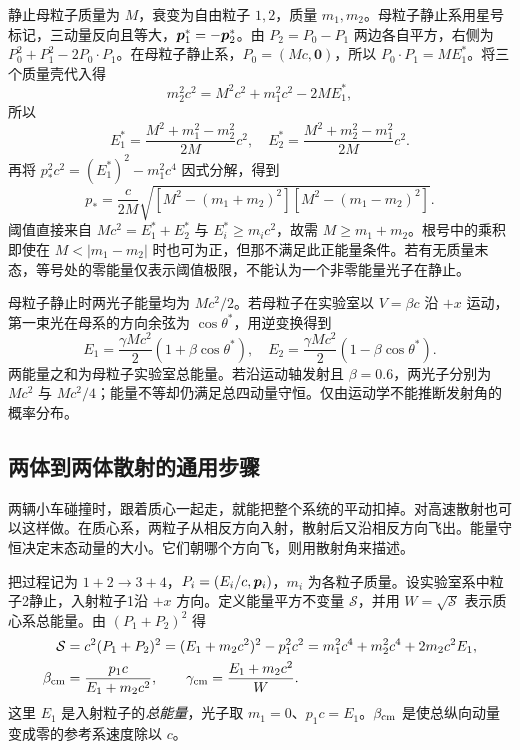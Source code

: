 静止母粒子质量为 $M$，衰变为自由粒子 $1,2$，质量 $m_1,m_2$。母粒子静止系用星号标记，三动量反向且等大，$\boldsymbol{p}_1^*=-\boldsymbol{p}_2^*$。由 $P_2=P_0-P_1$ 两边各自平方，右侧为 $P_0^2+P_1^2-2P_0\cdot P_1$。在母粒子静止系，$P_0=(Mc,\boldsymbol0)$，所以 $P_0\cdot P_1=ME_1^*$。将三个质量壳代入得
\[
m_2^2c^2=M^2c^2+m_1^2c^2-2ME_1^*,
\]
所以
\begin{equation}\label{eq:sr-decay}
E_1^*=\frac{M^2+m_1^2-m_2^2}{2M}c^2,\quad
E_2^*=\frac{M^2+m_2^2-m_1^2}{2M}c^2.
\end{equation}
再将 $p_*^2c^2=(E_1^*)^2-m_1^2c^4$ 因式分解，得到
\[
p_* =\frac{c}{2M}\sqrt{[M^2-(m_1+m_2)^2][M^2-(m_1-m_2)^2]}.
\]
阈值直接来自 $Mc^2=E_1^*+E_2^*$ 与 $E_i^*\ge m_i c^2$，故需 $M\ge m_1+m_2$。根号中的乘积即使在 $M<|m_1-m_2|$ 时也可为正，但那不满足此正能量条件。若有无质量末态，等号处的零能量仅表示阈值极限，不能认为一个非零能量光子在静止。

\begin{example}[运动母粒子衰变为两光子]
母粒子静止时两光子能量均为 $Mc^2/2$。若母粒子在实验室以 $V=\beta c$ 沿 $+x$ 运动，第一束光在母系的方向余弦为 $\cos\theta^*$，用逆变换得到
\[
E_1=\frac{\gamma Mc^2}{2}(1+\beta\cos\theta^*),\quad
E_2=\frac{\gamma Mc^2}{2}(1-\beta\cos\theta^*).
\]
两能量之和为母粒子实验室总能量。若沿运动轴发射且 $\beta=0.6$，两光子分别为 $Mc^2$ 与 $Mc^2/4$；能量不等却仍满足总四动量守恒。仅由运动学不能推断发射角的概率分布。
\end{example}

\subsection{两体到两体散射的通用步骤}\label{sec:sr-two-to-two}
两辆小车碰撞时，跟着质心一起走，就能把整个系统的平动扣掉。对高速散射也可以这样做。在质心系，两粒子从相反方向入射，散射后又沿相反方向飞出。能量守恒决定末态动量的大小。它们朝哪个方向飞，则用散射角来描述。

把过程记为 $1+2\to3+4$，$P_i=(E_i/c,\boldsymbol{p}_i)$，$m_i$ 为各粒子质量。设实验室系中粒子2静止，入射粒子1沿 $+x$ 方向。定义能量平方不变量 $\mathcal S$，并用 $W=\sqrt{\mathcal S}$ 表示质心系总能量。由 $(P_1+P_2)^2$ 得
\begin{align}
\mathcal S&=c^2(P_1+P_2)^2
=(E_1+m_2c^2)^2-p_1^2c^2
=m_1^2c^4+m_2^2c^4+2m_2c^2E_1,\nonumber\\
\beta_{\rm cm}&=\frac{p_1 c}{E_1+m_2c^2},
\qquad
\gamma_{\rm cm}=\frac{E_1+m_2c^2}{W}.
\label{eq:sr-scatter-fixed}
\end{align}
这里 $E_1$ 是入射粒子的\emph{总能量}，光子取 $m_1=0$、$p_1c=E_1$。$\beta_{\rm cm}$ 是使总纵向动量变成零的参考系速度除以 $c$。

